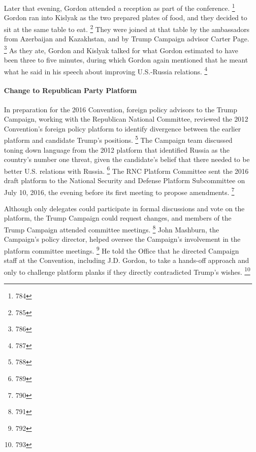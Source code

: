 Later that evening, Gordon attended a reception as part of the conference.%
\footnote{784}
Gordon ran into Kislyak as the two prepared plates of food, and they decided to sit at the same table to eat.%
\footnote{785}
They were joined at that table by the ambassadors from Azerbaijan and Kazakhstan, and by Trump Campaign advisor Carter Page.%
\footnote{786}
As they ate, Gordon and Kislyak talked for what Gordon estimated to have been three to five minutes, during which Gordon again mentioned that he meant what he said in his speech about improving U.S.-Russia relations.%
\footnote{787}

\paragraph{Change to Republican Party Platform}

In preparation for the 2016 Convention, foreign policy advisors to the Trump Campaign, working with the Republican National Committee, reviewed the 2012 Convention's foreign policy platform to identify divergence between the earlier platform and candidate Trump's positions.%
\footnote{788}
The Campaign team discussed toning down language from the 2012 platform that identified Russia as the country's number one threat, given the candidate's belief that there needed to be better U.S. relations with Russia.%
\footnote{789}
The RNC Platform Committee sent the 2016 draft platform to the National Security and Defense Platform Subcommittee on July 10, 2016, the evening before its first meeting to propose amendments.%
\footnote{790}

Although only delegates could participate in formal discussions and vote on the platform, the Trump Campaign could request changes, and members of the Trump Campaign attended committee meetings.%
\footnote{791}
John Mashburn, the Campaign's policy director, helped oversee the Campaign's involvement in the platform committee meetings.%
\footnote{792}
He told the Office that he directed Campaign staff at the Convention, including J.D. Gordon, to take a hands-off approach and only to challenge platform planks if they directly contradicted Trump's wishes.%
\footnote{793}

